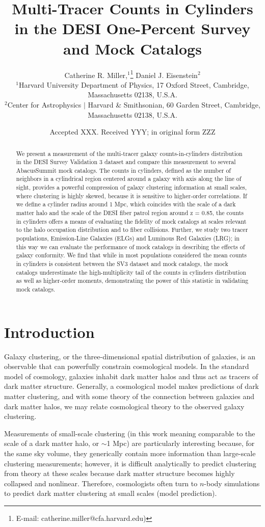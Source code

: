 \documentclass[fleqn,usenatbib]{mnras}
\title{Multi-Tracer Counts in Cylinders in the DESI One-Percent Survey and Mock Catalogs}
\author[Miller and Eisenstein]{
Catherine R. Miller,$^{1}$\thanks{E-mail: catherine.miller@cfa.harvard.edu)}
Daniel J. Eisenstein$^{2}$ \\
$^{1}$Harvard University Department of Physics, 17 Oxford Street, Cambridge, Massachusetts 02138, U.S.A.\\
$^{2}$Center for Astrophysics $\vert$ Harvard \& Smithsonian, 60 Garden Street, Cambridge, Massachusetts 02138, U.S.A.\\}
\date{Accepted XXX. Received YYY; in original form ZZZ}
\begin{document}
\label{firstpage}
\pagerange{\pageref{firstpage}--\pageref{lastpage}}
\maketitle
\begin{abstract}
We present a measurement of the multi-tracer galaxy counts-in-cylinders distribution in the DESI Survey Validation 3 dataset and compare this measurement to several AbacusSummit mock catalogs. The counts in cylinders, defined as the number of neighbors in a cylindrical region centered around a galaxy with axis along the line of sight, provides a powerful compression of galaxy clustering information at small scales, where clustering is highly skewed, because it is sensitive to higher-order correlations. If we define a cylinder radius around 1 Mpc, which coincides with the scale of a dark matter halo and the scale of the DESI fiber patrol region around z = 0.85, the counts in cylinders offers a means of evaluating the fidelity of mock catalogs at scales relevant to the halo occupation distribution and to fiber collisions. Further, we study two tracer populations, Emission-Line Galaxies (ELGs) and Luminous Red Galaxies (LRG); in this way we can evaluate the performance of mock catalogs in describing the effects of galaxy conformity. We find that while in most populations considered the mean counts in cylinders is consistent between the SV3 dataset and mock catalogs, the mock catalogs underestimate the high-multiplicity tail of the counts in cylinders distribution as well as higher-order moments, demonstrating the power of this statistic in validating mock catalogs.
\end{abstract}
\section*{Introduction}
Galaxy clustering, or the three-dimensional spatial distribution of galaxies, is an observable that can powerfully constrain cosmological models. In the standard model of cosmology, galaxies inhabit dark matter halos and thus act as tracers of dark matter structure. Generally, a cosmological model makes predictions of dark matter clustering, and with some theory of the connection between galaxies and dark matter halos, we may relate cosmological theory to the observed galaxy clustering.

Measurements of small-scale clustering (in this work meaning comparable to the scale of a dark matter halo, or $\sim$1 Mpc) are particularly interesting because, for the same sky volume, they generically contain more information than large-scale clustering measurements; however, it is difficult analytically to predict clustering from theory at these scales because dark matter structure becomes highly collapsed and nonlinear. Therefore, cosmologists often turn to $n$-body simulations to predict dark matter clustering at small scales (model prediction).
\end{document}

